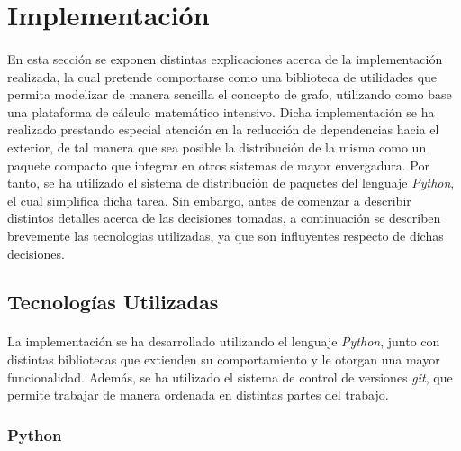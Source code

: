 \documentclass{subfiles}
\begin{document}
    \section{Implementación}
    \label{sec:implementation}

      \paragraph{}
      En esta sección se exponen distintas explicaciones acerca de la implementación realizada, la cual pretende comportarse como una biblioteca de utilidades que permita modelizar de manera sencilla el concepto de grafo, utilizando como base una plataforma de cálculo matemático intensivo. Dicha implementación se ha realizado prestando especial atención en la reducción de dependencias hacia el exterior, de tal manera que sea posible la distribución de la misma como un paquete compacto que integrar en otros sistemas de mayor envergadura. Por tanto, se ha utilizado el sistema de distribución de paquetes del lenguaje \emph{Python}, el cual simplifica dicha tarea. Sin embargo, antes de comenzar a describir distintos detalles acerca de las decisiones tomadas, a continuación se describen brevemente las tecnologias utilizadas, ya que son influyentes respecto de dichas decisiones.

      \subsection{Tecnologías Utilizadas}
      \label{sec:used_technologies}

        \paragraph{}
        La implementación se ha desarrollado utilizando el lenguaje \emph{Python}, junto con distintas bibliotecas que extienden su comportamiento y le otorgan una mayor funcionalidad. Además, se ha utilizado el sistema de control de versiones \emph{git}, que permite trabajar de manera ordenada en distintas partes del trabajo.

        \subsubsection{Python}
        \label{sec:python}
\end{document}
